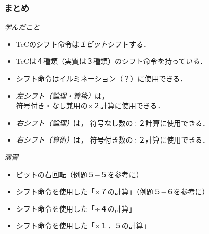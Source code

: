\documentclass{beamer}                 %
\begin{document}
\begin{frame}
  \frametitle{まとめ}
  \emph{学んだこと}
  \begin{itemize}
  \item TeCのシフト命令は\emph{１ビット}シフトする．
  \item TeCは４種類（実質は３種類）のシフト命令を持っている．
  \item シフト命令はイルミネーション（？）に使用できる．
  \item \emph{左シフト（論理・算術）}は，\\
    符号付き・なし兼用の×２計算に使用できる．
  \item \emph{右シフト（論理）}は，
    符号なし数の÷２計算に使用できる．
  \item \emph{右シフト（算術）}は，
    符号付き数の÷２計算に使用できる．
  \end{itemize}
  \vfill
  \emph{演習}
  \begin{itemize}
  \item ビットの右回転（例題５−５を参考に）
  \item シフト命令を使用した「×７の計算」（例題５−６を参考に）
  \item シフト命令を使用した「÷４の計算」
  \item シフト命令を使用した「×１．５の計算」
  \end{itemize}
  \vfill
\end{frame}
\end{document}
